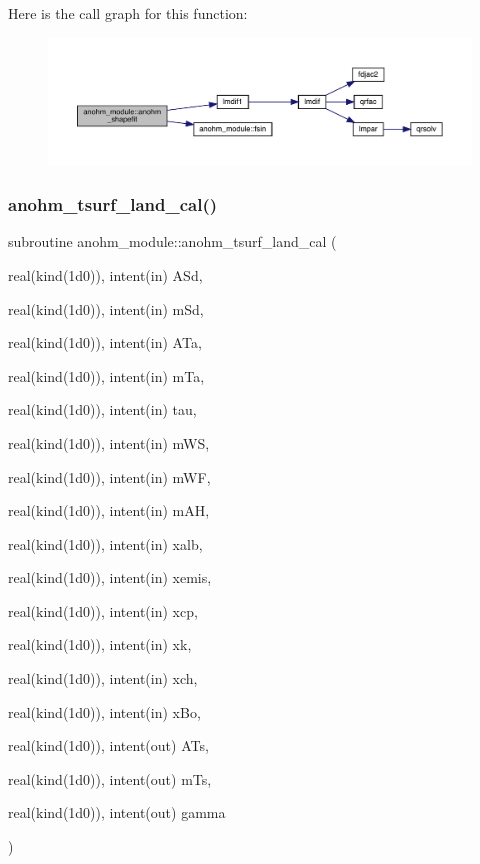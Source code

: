 Here is the call graph for this function\+:\nopagebreak
\begin{figure}[H]
\begin{center}
\leavevmode
\includegraphics[width=350pt]{namespaceanohm__module_aec263fe8fda2e14111cd3f27a607cff0_cgraph}
\end{center}
\end{figure}
\mbox{\label{namespaceanohm__module_a3f1a576bdde691f251c98f56d28b6c5e}} 
\subsubsection{\texorpdfstring{anohm\+\_\+tsurf\+\_\+land\+\_\+cal()}{anohm\_tsurf\_land\_cal()}}
{\footnotesize\ttfamily subroutine anohm\+\_\+module\+::anohm\+\_\+tsurf\+\_\+land\+\_\+cal (\begin{DoxyParamCaption}\item[{real(kind(1d0)), intent(in)}]{A\+Sd,  }\item[{real(kind(1d0)), intent(in)}]{m\+Sd,  }\item[{real(kind(1d0)), intent(in)}]{A\+Ta,  }\item[{real(kind(1d0)), intent(in)}]{m\+Ta,  }\item[{real(kind(1d0)), intent(in)}]{tau,  }\item[{real(kind(1d0)), intent(in)}]{m\+WS,  }\item[{real(kind(1d0)), intent(in)}]{m\+WF,  }\item[{real(kind(1d0)), intent(in)}]{m\+AH,  }\item[{real(kind(1d0)), intent(in)}]{xalb,  }\item[{real(kind(1d0)), intent(in)}]{xemis,  }\item[{real(kind(1d0)), intent(in)}]{xcp,  }\item[{real(kind(1d0)), intent(in)}]{xk,  }\item[{real(kind(1d0)), intent(in)}]{xch,  }\item[{real(kind(1d0)), intent(in)}]{x\+Bo,  }\item[{real(kind(1d0)), intent(out)}]{A\+Ts,  }\item[{real(kind(1d0)), intent(out)}]{m\+Ts,  }\item[{real(kind(1d0)), intent(out)}]{gamma }\end{DoxyParamCaption})}



